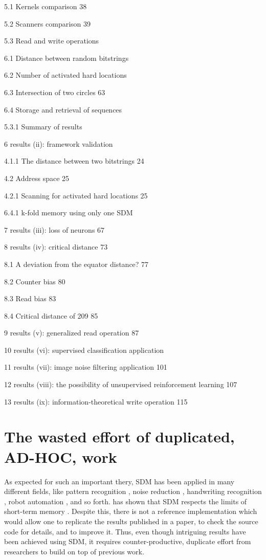 5.1 Kernels comparison 38

5.2 Scanners comparison 39

5.3 Read and write operations

6.1 Distance between random bitstrings

6.2 Number of activated hard locations

6.3 Intersection of two circles 63

6.4 Storage and retrieval of sequences

5.3.1 Summary of results

6 results (ii): framework validation

4.1.1 The distance between two bitstrings 24

4.2 Address space 25

4.2.1 Scanning for activated hard locations 25

6.4.1 k-fold memory using only one SDM

7 results (iii): loss of neurons 67

8 results (iv): critical distance 73

8.1 A deviation from the equator distance? 77

8.2 Counter bias 80

8.3 Read bias 83

8.4 Critical distance of 209 85

9 results (v): generalized read operation 87

10 results (vi): supervised classification
application

11 results (vii): image noise filtering application 101

12 results (viii): the possibility of unsupervised reinforcement learning 107

13 results (ix): information-theoretical write operation 115



\section{The wasted effort of duplicated, AD-HOC, work}

As expected for such an important thery, SDM has been applied in many different fields, like pattern recognition \citep{norman2003modeling, rao1995natural}, noise reduction \citep{Meng2009}, handwriting recognition \citep{fan1997genetic}, robot automation \citep{Rajesh1998, mendes2008robot}, and so forth. \citet{Linhares2011} has shown that SDM respects the limits of short-term memory \citep{Miller1955, Cowan2001}. Despite this, there is not a reference implementation which would allow one to replicate the results published in a paper, to check the source code for details, and to improve it. Thus, even though intriguing results have been achieved using SDM, it requires counter-productive, duplicate effort from researchers to build on top of previous work.

